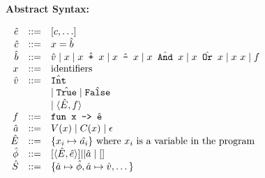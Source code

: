 \documentclass{article}
\begin{document}
\newpage

\textbf{Abstract Syntax: }
\begin{center}
    \begin{math}
        \begin{array}{r c l}
            \hat{e} & ::= & \lbrack c, \ldots \rbrack
            \\
            \hat{c} & ::= & x = \hat{b}
            \\
             \hat{b} & ::= & 
             	\hat{v}
             	\mid x
                \mid x \hat{\texttt{ + }} x
                \mid x \hat{\texttt{ - }} x 
                \mid x \hat{\texttt{ And }} x
                \mid x \hat{\texttt{ Or }} x
                \mid x \ x \mid f
            \\
            x & ::= & \text{identifiers}
             \\
             \hat{v} & ::= & 
             	\hat{\texttt{Int}}
             	\\&&
             	\mid \hat{\texttt{True}} 
             	\mid \hat{\texttt{False}}
             	\\&&
             	\mid \langle \hat{E}, f \rangle
            \\
            f & ::= & \texttt{fun x -> } \hat{\texttt{e}}
            \\
            \hat{a} & ::= & V(x) \mid C(x) \mid \epsilon
            \\
            \hat{E} & ::= & \{ x_i \mapsto \hat{a_i} \} \text{ where $x_i$ is a variable in the program}
            \\
            \hat{\phi} & ::= & \lbrack \langle \hat{E}, \hat{e} \rangle \rbrack || \hat{a} 
            \mid \lbrack\rbrack 
            \\
            \hat{S} & ::= & \{ \hat{a} \mapsto \hat{\phi}, \hat{a} \mapsto \hat{v}, \dots \}
             
\end{array}
\end{math}
\end{center}
\end{document}
